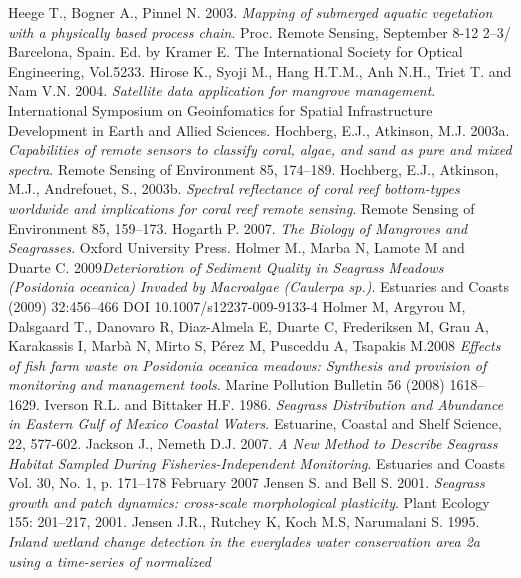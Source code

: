 \documentclass[10pt, a4paper]{article}
\begin{document}
\begin{thebibliography}{999}
Heege T., Bogner A., Pinnel N. 2003. \emph{Mapping of submerged aquatic vegetation with a
physically based process chain}. Proc. Remote Sensing, September 8-12 2--3/ Barcelona,
Spain. Ed. by Kramer E. The International Society for Optical Engineering, Vol.5233. \pageref{Heege03}
Hirose K., Syoji M., Hang H.T.M., Anh N.H., Triet T. and Nam V.N. 2004. \emph{Satellite
data application for mangrove management}. International Symposium on Geoinfomatics for
Spatial Infrastructure Development in Earth and Allied Sciences. \pageref{Hirose04} 
Hochberg, E.J., Atkinson, M.J. 2003a. \emph{Capabilities of remote sensors to classify coral,
algae, and sand as pure and mixed spectra}. Remote Sensing of Environment 85, 174–189. \pageref{Hochberg03a}
Hochberg, E.J., Atkinson, M.J., Andrefouet, S., 2003b. \emph{Spectral reflectance of coral reef
bottom-types worldwide and implications for coral reef remote sensing}. Remote Sensing of
Environment 85, 159–173. \pageref{Hochberg03b}
Hogarth P. 2007. \emph{The Biology of Mangroves and Seagrasses}. Oxford University Press. \pageref{Hogarth07}
Holmer M., Marba N, Lamote M and Duarte C. 2009\emph{Deterioration of Sediment Quality in
Seagrass Meadows (\textit{Posidonia oceanica}) Invaded by Macroalgae (Caulerpa sp.)}. Estuaries
and Coasts (2009) 32:456–466 DOI 10.1007/s12237-009-9133-4 \pageref{Hogarth07}
Holmer M, Argyrou M, Dalsgaard T., Danovaro R, Diaz-Almela E, Duarte C,
Frederiksen M, Grau A, Karakassis I, Marbà N, Mirto S, Pérez M, Pusceddu A, Tsapakis M.2008 \pageref{}
\emph{Effects of fish farm waste on \textit{Posidonia oceanica} meadows: Synthesis and provision of
monitoring and management tools}. Marine Pollution Bulletin 56 (2008) 1618–1629. \pageref{Holmer08}
Iverson R.L. and Bittaker H.F. 1986. \emph{Seagrass Distribution and Abundance in Eastern
Gulf of Mexico Coastal Waters}. Estuarine, Coastal and Shelf Science, 22, 577-602. \pageref{Iverson86}
Jackson J., Nemeth D.J. 2007. \emph{A New Method to Describe Seagrass Habitat Sampled
During Fisheries-Independent Monitoring}. Estuaries and Coasts Vol. 30, No. 1,
p. 171–178 February 2007 \pageref{Jackson07}
Jensen S. and Bell S. 2001. \emph{Seagrass growth and patch dynamics: cross-scale
morphological plasticity}. Plant Ecology 155: 201–217, 2001. \pageref{Jensen01}
Jensen J.R., Rutchey K, Koch M.S, Narumalani S. 1995. \emph{Inland wetland change
detection in the everglades water conservation area 2a using a time-series of normalized
}
\end{thebibliography}
\end{document}

